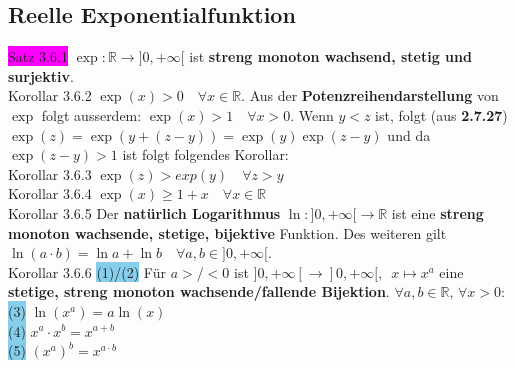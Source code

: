 \documentclass[landscape, 10pt]{article}
\newcommand{\R}{\mathbb{R}}
\begin{document}
\begin{multicols}{3}
       \subsection{Reelle Exponentialfunktion}
              \colorbox{magenta}{Satz 3.6.1} 
                     \textcolor{NavyBlue}{
                     $\exp:\R\longrightarrow]0,+\infty[$}
                     ist \textbf{streng monoton wachsend, stetig und surjektiv}.\\
              \colorbox{BurntOrange}{Korollar 3.6.2} 
                     \textcolor{NavyBlue}{$\exp(x)>0\quad\forall x\in\R$}. 
                     Aus der \textbf{Potenzreihendarstellung} von 
                     \textcolor{NavyBlue}{$\exp$} folgt ausserdem: 
                     \textcolor{NavyBlue}{$\exp(x)>1\quad\forall x>0$}. 
                     Wenn \textcolor{NavyBlue}{$y<z$} ist, folgt 
                     (aus \textbf{2.7.27}) 
                     \textcolor{NavyBlue}{
                     $\exp(z)=\exp(y+(z-y))=\exp(y)\exp(z-y)$}  
                     und da \textcolor{NavyBlue}{$\exp(z-y)>1$} 
                     ist folgt folgendes Korollar:\\
              \colorbox{BurntOrange}{Korollar 3.6.3} 
                     \textcolor{NavyBlue}{$\exp(z)>exp(y)\quad\forall z>y$}\\
              \colorbox{BurntOrange}{Korollar 3.6.4} 
                     \textcolor{NavyBlue}{
                     $\exp(x)\geqslant1+x\quad\forall x\in\R$}\\
              \colorbox{BurntOrange}{Korollar 3.6.5} 
                     Der \textbf{natürlich Logarithmus} 
                     $\ln:]0,+\infty[\longrightarrow\R$ ist eine 
                     \textbf{streng monoton 
                     wachsende, stetige, bijektive} Funktion. Des weiteren gilt 
                     \textcolor{NavyBlue}{
                     $\ln(a\cdot b)=\ln a+\ln b\quad\forall a,b\in]0,+\infty[$}.\\
              \colorbox{BurntOrange}{Korollar 3.6.6} 
                     \colorbox{SkyBlue}{(1)/(2)}
                            Für \textcolor{NavyBlue}{$a>$/$<0$} 
                            ist \textcolor{NavyBlue}{
                            $]0,+\infty[\longrightarrow]0,+\infty[,$\,
                            $x\longmapsto x^a$}
                            eine \textbf{stetige, streng monoton 
                            wachsende/fallende Bijektion}. 
                            \textcolor{NavyBlue}{
                            $\forall a,b\in\R,\,\forall x>0$}:\\
                     \colorbox{SkyBlue}{(3)} 
                            \textcolor{NavyBlue}{$\ln(x^a)=a\ln(x)$}\\
                     \colorbox{SkyBlue}{(4)} 
                            \textcolor{NavyBlue}{$x^a\cdot x^b=x^{a+b}$}\\
                     \colorbox{SkyBlue}{(5)} 
                            \textcolor{NavyBlue}{$(x^a)^b=x^{a\cdot b}$}

\end{multicols}
\end{document}
